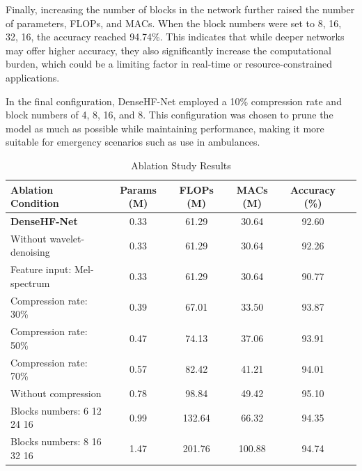 Finally, increasing the number of blocks in the network further raised the number of parameters, FLOPs, and MACs. When the block numbers were set to 8, 16, 32, 16, the accuracy reached 94.74\%. This indicates that while deeper networks may offer higher accuracy, they also significantly increase the computational burden, which could be a limiting factor in real-time or resource-constrained applications.

In the final configuration, DenseHF-Net employed a 10\% compression rate and block numbers of 4, 8, 16, and 8. This configuration was chosen to prune the model as much as possible while maintaining performance, making it more suitable for emergency scenarios such as use in ambulances.
\begin{table}[htbp]
    \centering
    \caption{Ablation Study Results}
    \label{table:ablation_results}
    \begin{tabularx}{\textwidth}{L|CCCCC}
    \toprule
    Ablation Condition & Params (M) & FLOPs (M) & MACs (M) & Accuracy (\%) \\ 
    \midrule
    \textbf{DenseHF-Net }           &0.33& 61.29& 30.64& 92.60 \\
    Without wavelet-denoising  &0.33& 61.29& 30.64& 92.26 \\
    Feature input: Mel-spectrum &0.33& 61.29& 30.64& 90.77\\
   Compression rate: 30\%& 0.39& 67.01& 33.50&93.87\\
   Compression rate: 50\%& 0.47& 74.13 & 37.06&93.91\\
   Compression rate: 70\%& 0.57& 82.42 & 41.21&94.01\\
   Without compression &0.78& 98.84& 49.42& 95.10\\
    Blocks numbers: 6 12 24 16  & 0.99    & 132.64     & 66.32     & 94.35  \\
    Blocks numbers: 8 16 32 16  & 1.47    & 201.76      & 100.88    & 94.74  \\
    \bottomrule
    \end{tabularx}
\end{table}